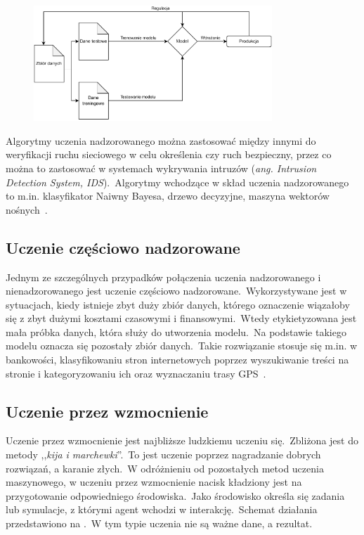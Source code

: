 \begin{figure}[H]
    \centering
    \includegraphics[width=0.8\textwidth]{images/supervised}
    \label{fig:spervised}
\end{figure}

Algorytmy uczenia nadzorowanego można zastosować między innymi do weryfikacji ruchu sieciowego w celu określenia czy ruch bezpieczny, przez co można to zastosować w systemach wykrywania intruzów (\textit{ang. Intrusion Detection System, IDS}).\ Algorytmy wchodzące w skład uczenia nadzorowanego to m.in. klasyfikator Naiwny Bayesa, drzewo decyzyjne, maszyna wektorów nośnych~\cite{AiScience, Mahesh2018}.

\subsection{Uczenie częściowo nadzorowane}
Jednym ze szczególnych przypadków połączenia uczenia nadzorowanego i nienadzorowanego jest uczenie częściowo nadzorowane.\ Wykorzystywane jest w sytuacjach, kiedy istnieje zbyt duży zbiór danych, którego oznaczenie wiązałoby się z zbyt dużymi kosztami czasowymi i finansowymi.\ Wtedy etykietyzowana jest mała próbka danych, która służy do utworzenia modelu.\ Na podstawie takiego modelu oznacza się pozostały zbiór danych.\ Takie rozwiązanie stosuje się m.in. w bankowości, klasyfikowaniu stron internetowych poprzez wyszukiwanie treści na stronie i kategoryzowaniu ich oraz wyznaczaniu trasy GPS~\cite{semiLinkedin, Mahesh2018}.

\subsection{Uczenie przez wzmocnienie}
Uczenie przez wzmocnienie jest najbliższe ludzkiemu uczeniu się.\ Zbliżona jest do metody ,,\textit{kija i marchewki}''.\ To jest uczenie poprzez nagradzanie dobrych rozwiązań, a karanie złych.\ W odróżnieniu od pozostałych metod uczenia maszynowego, w uczeniu przez wzmocnienie nacisk kładziony jest na przygotowanie odpowiedniego środowiska.\ Jako środowisko określa się zadania lub symulacje, z którymi agent wchodzi w interakcję.\ Schemat działania przedstawiono na .\ W tym typie uczenia nie są ważne dane, a rezultat.


